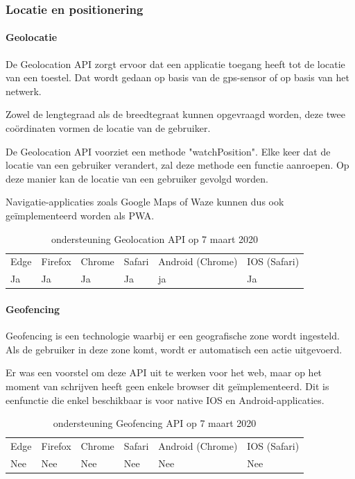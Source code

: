 \subsubsection{Locatie en positionering}

\paragraph{Geolocatie}
De Geolocation API \autocite{Popescu2018} zorgt ervoor dat een applicatie toegang heeft tot de locatie van een toestel. Dat wordt gedaan op basis van de gps-sensor of op basis van het netwerk. 

Zowel de lengtegraad als de breedtegraat kunnen opgevraagd worden, deze twee coördinaten vormen de locatie van de gebruiker.


De Geolocation API voorziet een methode "watchPosition". Elke keer dat de locatie van een gebruiker verandert, zal deze methode een functie aanroepen. Op deze manier kan de locatie van een gebruiker gevolgd worden.

Navigatie-applicaties zoals Google Maps of Waze kunnen dus ook geïmplementeerd worden als PWA.

\begin{table}[H]
	\centering
	\begin{tabular}{llllll}
		Edge & Firefox & Chrome & Safari & Android (Chrome) & IOS (Safari) \\
		Ja   & Ja      &  Ja     & Ja     & ja               & Ja          
	\end{tabular}	
	\caption{ondersteuning Geolocation API op 7 maart 2020}
\end{table}


\paragraph{Geofencing}
Geofencing is een technologie waarbij er een geografische zone wordt ingesteld. Als de gebruiker in deze zone komt, wordt er automatisch een actie uitgevoerd. 

Er was een voorstel om deze API \autocite{Kruisselbrink2017} uit te werken voor het web, maar op het moment van schrijven heeft geen enkele browser dit geïmplementeerd. Dit is eenfunctie die enkel beschikbaar is voor native IOS en Android-applicaties.

\begin{table}[H]
	\centering
	\begin{tabular}{llllll}
		Edge & Firefox & Chrome & Safari & Android (Chrome) & IOS (Safari) \\
		Nee   & Nee      &  Nee     & Nee     & Nee               & Nee          
	\end{tabular}	
	\caption{ondersteuning Geofencing API op 7 maart 2020}
\end{table}


